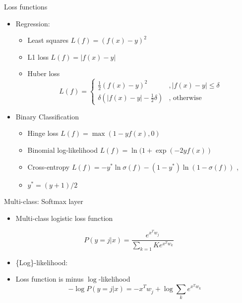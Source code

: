 \documentclass[12pt,notes,mathserif]{beamer}
\providecommand{\tightlist}{%
	\setlength{\itemsep}{0pt}\setlength{\parskip}{0pt}}
\begin{document}
\begin{frame}{Loss functions}

\begin{itemize}
\tightlist
\item
  Regression:

  \begin{itemize}
  \tightlist
  \item
    Least squares \(L(f)=(f(x)-y)^{2}\)
  \item
    L1 loss \(L(f)=|f(x)-y|\)
  \item
    Huber loss
    \[L({f})=\begin{cases} \frac{1}{2} (f(x)-y)^2 & , |f(x)-y| \le \delta \\ \delta (|f(x)-y| -\frac{1}{2} \delta ) & \textrm{, otherwise} \end{cases}\]
  \end{itemize}
\item
  Binary Classification

  \begin{itemize}
  \tightlist
  \item
    Hinge loss \(L(f)=\max(1-yf(x), 0)\)
  \item
    Binomial log-likelihood \(L(f)=\ln(1+\exp(-2yf(x))\)
  \item
    Cross-entropy
    \(L(f)=-y^{*}\ln \sigma(f)-(1-y^{*})\ln(1- \sigma(f))\) ,
  \item
    \(y^{*}=(y+1)/2\)
  \end{itemize}
\end{itemize}

\end{frame}

\begin{frame}{Multi-class: Softmax layer}

\begin{itemize}
\tightlist
\item
  Multi-class logistic loss function
\end{itemize}

\[P(y=j|x)=\frac{e^{x^Tw_j}}{\sum_{k=1}{K}e^{x^Tw_k}}\]

\begin{itemize}
\tightlist
\item
  \{\rm Log\}-likelihood:
\item
  Loss function is minus \(\log\)-likelihood \[
  -\log P(y=j|x)=-x^{T}w_{\dot{j}}+\log\sum_{k}e^{x^{T}w_{k}}
  \]
\end{itemize}

\end{frame}
\end{document}
